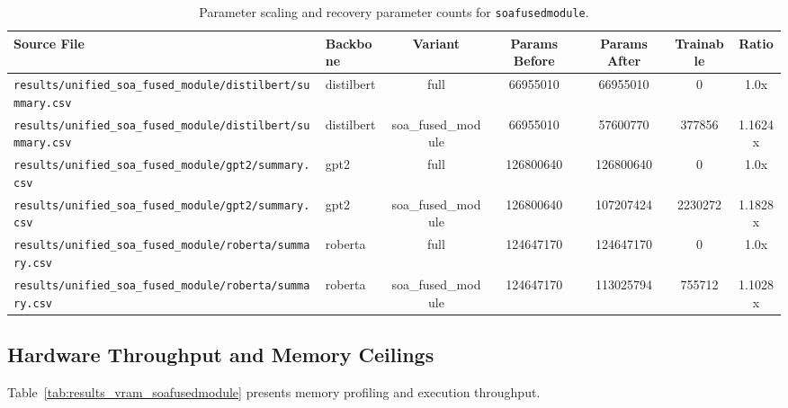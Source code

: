 \begin{table}[t]
\centering
\small
\begin{tabular}{llccccc}
\toprule
\textbf{Source File} & \textbf{Backbone} & \textbf{Variant} & \textbf{Params Before} & \textbf{Params After} & \textbf{Trainable} & \textbf{Ratio} \\
\midrule
\texttt{results/unified\_soa\_fused\_module/distilbert/summary.csv} & distilbert & full & 66955010 & 66955010 & 0 & 1.0x \\
\texttt{results/unified\_soa\_fused\_module/distilbert/summary.csv} & distilbert & soa\_fused\_module & 66955010 & 57600770 & 377856 & 1.1624x \\
\texttt{results/unified\_soa\_fused\_module/gpt2/summary.csv} & gpt2 & full & 126800640 & 126800640 & 0 & 1.0x \\
\texttt{results/unified\_soa\_fused\_module/gpt2/summary.csv} & gpt2 & soa\_fused\_module & 126800640 & 107207424 & 2230272 & 1.1828x \\
\texttt{results/unified\_soa\_fused\_module/roberta/summary.csv} & roberta & full & 124647170 & 124647170 & 0 & 1.0x \\
\texttt{results/unified\_soa\_fused\_module/roberta/summary.csv} & roberta & soa\_fused\_module & 124647170 & 113025794 & 755712 & 1.1028x \\
\bottomrule
\end{tabular}
\caption{Parameter scaling and recovery parameter counts for \texttt{soafusedmodule}.}
\label{tab:results_params_soafusedmodule}
\end{table}

\subsection{Hardware Throughput and Memory Ceilings}
Table~\ref{tab:results_vram_soafusedmodule} presents memory profiling and execution throughput.

